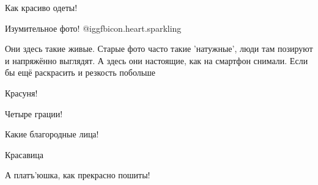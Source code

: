  
 
 
 
 

Как красиво одеты!

Изумительное фото! @igg{fbicon.heart.sparkling} 


Они здесь такие живые. Старые фото часто такие 'натужные', люди там позируют и
напряжённо выглядят. А здесь они настоящие, как на смартфон снимали. Если бы
ещё раскрасить и резкость побольше

Красуня!

Четыре грации!

Какие благородные лица!

Красавица

А платъ'юшка, как прекрасно пошиты!
